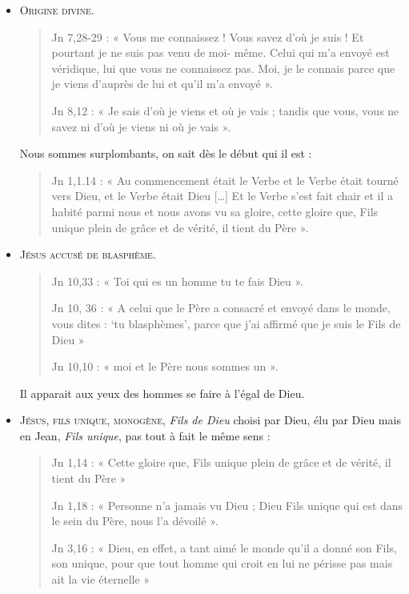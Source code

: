      \begin{itemize}
         \item \textsc{Origine divine}.
         \begin{quote}
Jn 7,28-29 : « Vous me connaissez ! Vous savez d'où je suis ! Et
pourtant je ne suis pas venu de moi- même. Celui qui m'a envoyé est
véridique, lui que vous ne connaissez pas. Moi, je le connais parce que
je viens d'auprès de lui et qu'il m'a envoyé ».

Jn 8,12 : « Je sais d'où je viens et où je vais ; tandis que vous, vous
ne savez ni d'où je viens ni où je vais ».
         \end{quote}
         Nous sommes surplombants, on sait dès le début qui il est :
         \begin{quote}
             Jn 1,1.14 : « Au commencement était le Verbe et le Verbe était tourné
vers Dieu, et le Verbe était Dieu {[}\ldots{]} Et le Verbe s'est fait
chair et il a habité parmi nous et nous avons vu sa gloire, cette gloire
que, Fils unique plein de grâce et de vérité, il tient du Père ».
         \end{quote}
         
         \item \textsc{Jésus accusé de blasphème}.
         \begin{quote}
             Jn 10,33 : « Toi qui es un homme tu te fais Dieu ».

Jn 10, 36 : « A celui que le Père a consacré et envoyé dans le monde,
vous dites : `tu blasphèmes', parce que j'ai affirmé que je suis le Fils
de Dieu »

Jn 10,10 : « moi et le Père nous sommes un ».
         \end{quote}
         Il apparait aux yeux des hommes se faire à l'égal de Dieu.
         \item \textsc{Jésus, fils unique, monogène}, \textit{Fils de Dieu} choisi par Dieu, élu par Dieu mais en Jean, \textit{Fils unique}, pas tout à fait le même sens : 
         
         \begin{quote}
           
Jn 1,14 : « Cette gloire que, Fils unique plein de grâce et de vérité,
il tient du Père »

Jn 1,18 : « Personne n'a jamais vu Dieu ; Dieu Fils unique qui est dans
le sein du Père, nous l'a dévoilé ».

Jn 3,16 : « Dieu, en effet, a tant aimé le monde qu'il a donné son Fils,
son unique, pour que tout homme qui croit en lui ne périsse pas mais ait
la vie éternelle »  


\end{quote}
\end{itemize}
